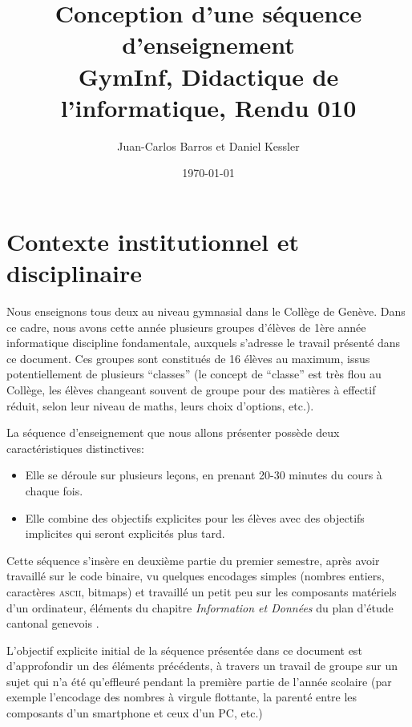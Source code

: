 \documentclass[11pt,bibliography=totoc]{scrartcl}
\author{Juan-Carlos Barros et Daniel Kessler}
\date{\today}
\title{Conception d'une séquence d'enseignement\\\medskip
  \large GymInf, Didactique de l'informatique, Rendu 010}
\begin{document}
\thispagestyle{plain}  %

\maketitle
\tableofcontents  %
\pagebreak

\section{Contexte institutionnel et disciplinaire}
Nous enseignons tous deux au niveau gymnasial dans le Collège de Genève. Dans ce
cadre, nous avons cette année plusieurs groupes d'élèves de 1ère année
informatique discipline fondamentale, auxquels s'adresse le travail présenté
dans ce document. Ces groupes sont constitués de 16 élèves au maximum, issus
potentiellement de plusieurs ``classes'' (le concept de ``classe'' est très flou
au Collège, les élèves changeant souvent de groupe pour des matières à effectif
réduit, selon leur niveau de maths, leurs choix d'options, etc.).

La séquence d'enseignement que nous allons présenter possède deux
caractéristiques distinctives:
\begin{itemize}
\item Elle se déroule sur plusieurs leçons, en prenant 20-30 minutes du cours à
  chaque fois.
\item Elle combine des objectifs explicites pour les élèves avec des objectifs
  implicites qui seront explicités plus tard.
\end{itemize}

Cette séquence s'insère en deuxième partie du premier semestre, après avoir
travaillé sur le code binaire, vu quelques encodages simples (nombres entiers,
caractères \textsc{ascii}, bitmaps) et travaillé un petit peu sur les composants
matériels d'un ordinateur, éléments du chapitre \textit{Information et Données}
du plan d'étude cantonal genevois \autocite{pecinfo}.

L'objectif explicite initial de la séquence présentée dans ce document est
d'approfondir un des éléments précédents, à travers un travail de groupe sur un
sujet qui n'a été qu'effleuré pendant la première partie de l'année scolaire
(par exemple l'encodage des nombres à virgule flottante, la parenté entre les
composants d'un smartphone et ceux d'un PC, etc.)
\end{document}

